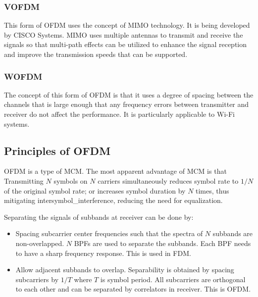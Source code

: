 
\subsubsection{\gls{VOFDM}}
This form of \gls{OFDM} uses the concept of \gls{MIMO} technology. It is being developed by CISCO Systems. \gls{MIMO} uses multiple antennas to transmit and receive the signals so that multi-path effects can be utilized to enhance the signal reception and improve the transmission speeds that can be supported.

\subsubsection{\gls{WOFDM}}
The concept of this form of OFDM is that it uses a degree of spacing between the channels that is large enough that any frequency errors between transmitter and receiver do not affect the performance. It is particularly applicable to Wi-Fi systems.

\subsection{Principles of \gls{OFDM}}
\gls{OFDM} is a type of \gls{MCM}\cite{fuqin}. The most apparent advantage of \gls{MCM} is that Transmitting $N$ symbols on $N$ carriers simultaneously reduces symbol rate to $1/N$ of the original symbol rate; or increases symbol duration by $N$ times, thus mitigating \gls{intersymbol_interference}, reducing the need for \gls{equalization}.

Separating the signals of \gls{subband}s at receiver can be done by:
\begin{itemize}
	\item Spacing subcarrier center frequencies such that the spectra of $N$ \gls{subband}s are non-overlapped. $N$
	\gls{BPF}s are used to separate the \gls{subband}s. Each \gls{BPF} needs to have a sharp frequency response. This is used in \gls{FDM}.
	\item Allow adjacent \gls{subband}s to overlap. Separability is obtained by spacing \gls{subcarrier}s by $1/T$ where $T$ is symbol period. All \gls{subcarrier}s are \gls{orthogonal} to each other and can be separated by correlators in receiver. This is \gls{OFDM}.
\end{itemize}


